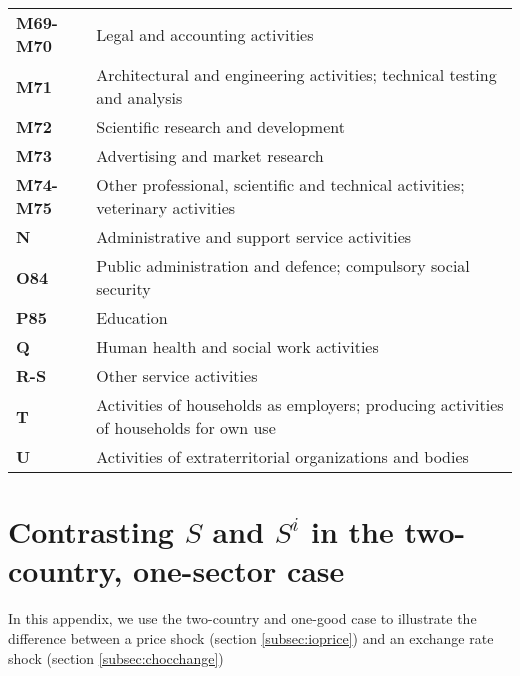 \documentclass[11pt,a4paper]{article}
\begin{document}
\begin{table}[!h]
\begin{tabular}{ll}
\textbf{M69-M70} &{Legal and accounting activities}\\
\textbf{M71} &{Architectural and engineering activities; technical testing and analysis}\\
\textbf{M72} &{Scientific research and development}\\
\textbf{M73} &{Advertising and market research}\\
\textbf{M74-M75} &{Other professional, scientific and technical activities; veterinary activities}\\
\textbf{N} &{Administrative and support service activities}\\
\textbf{O84} &{Public administration and defence; compulsory social security}\\
\textbf{P85} &{Education}\\
\textbf{Q} &{Human health and social work activities}\\
\textbf{R-S} &{Other service activities}\\
\textbf{T} &{Activities of households as employers; producing activities of households for own use}\\
\textbf{U} &{Activities of extraterritorial organizations and bodies}\\
  	\end{tabular}
\label{tab:wiodindustries}
\end{table}

\newpage
\section{Contrasting $S$ and $S^i$ in the two-country, one-sector case}
In this appendix, we use the two-country and one-good case to illustrate the difference between a price shock (section \ref{subsec:ioprice}) and an exchange rate shock (section \ref{subsec:chocchange})
\end{document}
